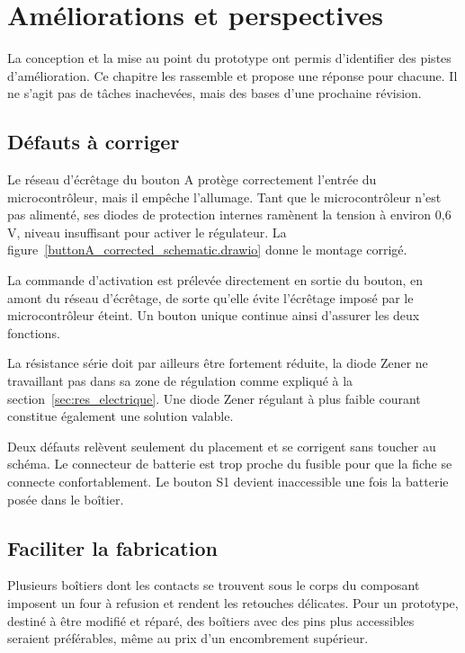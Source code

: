 \chapter{Améliorations et perspectives}
\label{chap:ameliorations}

La conception et la mise au point du prototype ont permis d'identifier des pistes d'amélioration. Ce chapitre les rassemble et propose une réponse pour chacune. Il ne s'agit pas de tâches inachevées, mais des bases d'une prochaine révision.

\section{Défauts à corriger}
\label{sec:amel_defauts}

Le réseau d'écrêtage du bouton A protège correctement l'entrée du microcontrôleur, mais il empêche l'allumage. Tant que le microcontrôleur n'est pas alimenté, ses diodes de protection internes ramènent la tension à environ 0,6 V, niveau insuffisant pour activer le régulateur. La figure~\ref{buttonA_corrected_schematic.drawio} donne le montage corrigé.


La commande d'activation est prélevée directement en sortie du bouton, en amont du réseau d'écrêtage, de sorte qu'elle évite l'écrêtage imposé par le microcontrôleur éteint. Un bouton unique continue ainsi d'assurer les deux fonctions.

La résistance série doit par ailleurs être fortement réduite, la diode Zener ne travaillant pas dans sa zone de régulation comme expliqué à la section~\ref{sec:res_electrique}. Une diode Zener régulant à plus faible courant constitue également une solution valable.

Deux défauts relèvent seulement du placement et se corrigent sans toucher au schéma. Le connecteur de batterie est trop proche du fusible pour que la fiche se connecte confortablement. Le bouton S1 devient inaccessible une fois la batterie posée dans le boîtier.

\section{Faciliter la fabrication}
\label{sec:amel_miseaupoint}

Plusieurs boîtiers dont les contacts se trouvent sous le corps du composant imposent un four à refusion et rendent les retouches délicates. Pour un prototype, destiné à être modifié et réparé, des boîtiers avec des pins plus accessibles seraient préférables, même au prix d'un encombrement supérieur.

